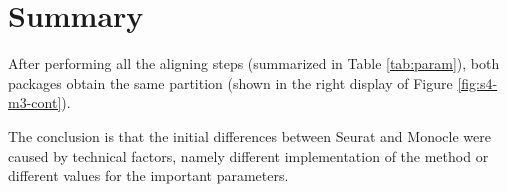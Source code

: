 \section{Summary}
After performing all the aligning steps (summarized in Table \ref{tab:param}), both packages obtain the same partition (shown in the right display of Figure \ref{fig:s4-m3-cont}).

The conclusion is that the initial differences between Seurat and Monocle were caused by technical factors, namely different implementation of the method or different values for the important parameters.

\begin{table}[]
\end{table}
